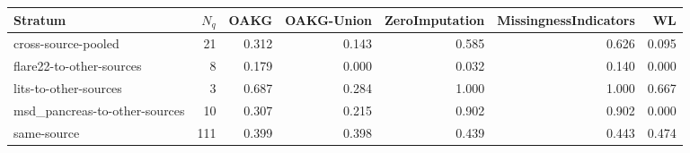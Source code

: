 \begin{tabular}{lrrrrrr}
\toprule
Stratum & $N_q$ & OAKG & OAKG-Union & ZeroImputation & MissingnessIndicators & WL \\
\midrule
cross-source-pooled & 21 & 0.312 & 0.143 & 0.585 & 0.626 & 0.095 \\
flare22-to-other-sources & 8 & 0.179 & 0.000 & 0.032 & 0.140 & 0.000 \\
lits-to-other-sources & 3 & 0.687 & 0.284 & 1.000 & 1.000 & 0.667 \\
msd\_pancreas-to-other-sources & 10 & 0.307 & 0.215 & 0.902 & 0.902 & 0.000 \\
same-source & 111 & 0.399 & 0.398 & 0.439 & 0.443 & 0.474 \\
\bottomrule
\end{tabular}
